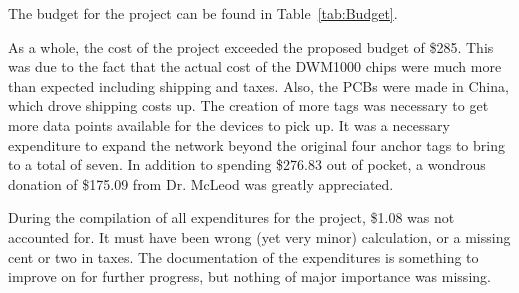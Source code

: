The budget for the project can be found in Table~\ref{tab:Budget}.

As a whole, the cost of the project exceeded the proposed budget of \$285. This was due to the fact that the actual cost of the DWM1000 chips were much more than expected including shipping and taxes. Also, the PCBs were made in China, which drove shipping costs up. The creation of more tags was necessary to get more data points available for the devices to pick up. It was a necessary expenditure to expand the network beyond the original four anchor tags to bring to a total of seven. In addition to spending \$276.83 out of pocket, a wondrous donation of \$175.09 from Dr. McLeod was greatly appreciated.

During the compilation of all expenditures for the project, \$1.08 was not accounted for. It must have been wrong (yet very minor) calculation, or a missing cent or two in taxes. The documentation of the expenditures is something to improve on for further progress, but nothing of major importance was missing.
